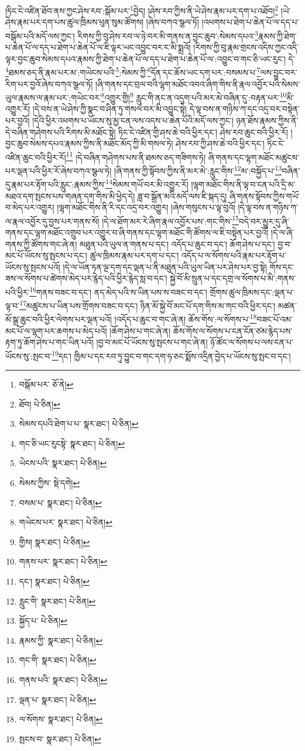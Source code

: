 །ཏིང་ངེ་འཛིན་ཐོབ་ནས་ཀྱང་ཤེས་རབ་:སྒོམ་པར་\footnote{བསྒོམ་པར་  ཅོ་ནེ། }བྱེད། །ཤེས་རབ་ཀྱིས་ནི་ཡེ་ཤེས་རྣམ་པར་དག་པ་འཐོབ།\footnote{ཐོབ།  པེ་ཅིན། } །ཡེ་ཤེས་རྣམ་པར་དག་པས་ཚུལ་ཁྲིམས་ཕུན་སུམ་ཚོགས། །ཞེས་བཀའ་སྩལ་ཏོ། །འཕགས་པ་ཐེག་པ་ཆེན་པོ་ལ་དད་པ་བསྒོམ་པའི་མདོ་ལས་ཀྱང་། རིགས་ཀྱི་བུ་ཤེས་རབ་ལ་ཉེ་བར་མི་གནས་ན་བྱང་ཆུབ་:སེམས་དཔའ་\footnote{སེམས་དཔའི་ཐེག་པ་པ་  སྣར་ཐང་།  པེ་ཅིན། }རྣམས་ཀྱི་ཐེག་པ་ཆེན་པོ་ལ་དད་པ་ཐེག་པ་ཆེན་པོ་ལ་ཇི་ལྟར་ཡང་འབྱུང་བར་ང་མི་སྨྲའོ། །རིགས་ཀྱི་བུ་རྣམ་གྲངས་འདིས་ཀྱང་འདི་ལྟར་བྱང་ཆུབ་སེམས་དཔའ་རྣམས་ཀྱི་ཐེག་པ་ཆེན་པོ་ལ་དད་པ་ཐེག་པ་ཆེན་པོ་ལ་:འབྱུང་བ་གང་ཅི་ཡང་རུང་། དེ་\footnote{གང་ཅི་ཡང་རུངསྟེ་  སྣར་ཐང་།  པེ་ཅིན། }ཐམས་ཅད་ནི་རྣམ་པར་མ་:གཡེངས་པའི་\footnote{ཡེངས་པའི་  སྣར་ཐང་།  པེ་ཅིན། }:སེམས་ཀྱི་\footnote{སེམས་ཀྱིས་  སྡེ་དགེ། }དོན་དང་ཆོས་ཡང་དག་པར་:བསམས་པ་\footnote{བསམ་པ་  སྣར་ཐང་།  པེ་ཅིན། }ལས་བྱུང་བར་རིག་པར་བྱའོ་ཞེས་བཀའ་སྩལ་ཏོ། །ཞི་གནས་དང་བྲལ་བའི་ལྷག་མཐོང་འབའ་ཞིག་གིས་ནི་རྣལ་འབྱོར་པའི་སེམས་ཡུལ་རྣམས་ལ་རྣམ་པར་:གཡེང་བར་\footnote{གཡེངས་པར་  སྣར་ཐང་།  པེ་ཅིན། }འགྱུར་གྱི།\footnote{གྱིས།  སྣར་ཐང་།  པེ་ཅིན། } རླུང་གི་ནང་ན་འདུག་པའི་མར་མེ་བཞིན་དུ་:བརྟན་པར་\footnote{གནས་པར་  སྣར་ཐང་།  པེ་ཅིན། }མི་འགྱུར་རོ། །དེ་བས་ན་ཡེ་ཤེས་ཀྱི་སྣང་བ་ཤིན་ཏུ་གསལ་བར་མི་འབྱུང་སྟེ། དེ་ལྟ་བས་ན་གཉིས་ཀ་དང་འདྲ་བར་བསྟེན་པར་བྱའོ། །དེའི་ཕྱིར་འཕགས་པ་ཡོངས་སུ་མྱ་ངན་ལས་འདས་པ་ཆེན་པོའི་མདོ་ལས་ཀྱང་། ཉན་ཐོས་རྣམས་ཀྱིས་ནི་དེ་བཞིན་གཤེགས་པའི་རིགས་མི་མཐོང་སྟེ། ཏིང་ངེ་འཛིན་གྱི་ཤས་ཆེ་བའི་ཕྱིར་དང་། ཤེས་རབ་ཆུང་བའི་ཕྱིར་རོ། །བྱང་ཆུབ་སེམས་དཔའ་རྣམས་ཀྱིས་ནི་མཐོང་མོད་ཀྱི་མི་གསལ་ཏེ། ཤེས་རབ་ཀྱི་ཤས་ཆེ་བའི་ཕྱིར་དང་། ཏིང་ངེ་འཛིན་ཆུང་བའི་ཕྱིར་རོ།\footnote{དང་།  སྣར་ཐང་།  པེ་ཅིན། } །དེ་བཞིན་གཤེགས་པས་ནི་ཐམས་ཅད་གཟིགས་ཏེ། ཞི་གནས་དང་ལྷག་མཐོང་མཚུངས་པར་ལྡན་པའི་ཕྱིར་རོ་ཞེས་བཀའ་སྩལ་ཏེ། །ཞི་གནས་ཀྱི་སྟོབས་ཀྱིས་ནི་མར་མེ་:རླུང་གིས་\footnote{རླུང་གི་  སྣར་ཐང་།  པེ་ཅིན། }མ་:བསྐྱོད་པ་\footnote{སྐྱོད་པ་  པེ་ཅིན། }བཞིན་དུ་རྣམ་པར་རྟོག་པའི་རླུང་:རྣམས་ཀྱིས་\footnote{རྣམས་ཀྱི་  སྣར་ཐང་།  པེ་ཅིན། }སེམས་གཡོ་བར་མི་འགྱུར་རོ། །ལྷག་མཐོང་གིས་ནི་ལྟ་བ་ངན་པའི་དྲི་མ་མཐའ་དག་སྤངས་པས་གཞན་དག་གིས་མི་ཕྱེད་དེ། ཟླ་བ་སྒྲོན་མའི་མདོ་ལས་ཇི་སྐད་དུ། ཞི་གནས་སྟོབས་ཀྱིས་གཡོ་བ་མེད་པར་འགྱུར། །ལྷག་མཐོང་གིས་ནི་རི་དང་འདྲ་བར་འགྱུར། །ཞེས་གསུངས་པ་ལྟ་བུའོ། །དེ་ལྟ་བས་ན་གཉིས་ཀ་ལ་རྣལ་འབྱོར་དུ་བྱས་པར་གནས་སོ། །དེ་ལ་ཐོག་མར་རེ་ཞིག་རྣལ་འབྱོར་པས་:གང་གིས་\footnote{གང་གི་  སྣར་ཐང་།  པེ་ཅིན། }བདེ་བར་མྱུར་དུ་ཞི་གནས་དང་ལྷག་མཐོང་འགྲུབ་པར་འགྱུར་བ་ཞི་གནས་དང་ལྷག་མཐོང་གི་ཚོགས་ལ་ཇི་བསྟེན་པར་བྱའོ། །དེ་ལ་ཞི་གནས་ཀྱི་ཚོགས་གང་ཞེ་ན། མཐུན་པའི་ཡུལ་ན་གནས་པ་དང་། འདོད་པ་ཆུང་བ་དང་། ཆོག་ཤེས་པ་དང་། བྱ་བ་མང་པོ་ཡོངས་སུ་སྤངས་པ་དང་། ཚུལ་ཁྲིམས་རྣམ་པར་དག་པ་དང་། འདོད་པ་ལ་སོགས་པའི་རྣམ་པར་རྟོག་པ་ཡོངས་སུ་སྤངས་པའོ། །དེ་ལ་ཡོན་ཏན་ལྔ་དག་དང་ལྡན་པ་ནི་མཐུན་པའི་ཡུལ་ཡིན་པར་ཤེས་པར་བྱ་སྟེ། གོས་དང་ཟས་ལ་སོགས་པ་ཚེགས་མེད་པར་རྙེད་པའི་ཕྱིར་རྙེད་སླ་བ་དང་། སྐྱེ་བོ་མི་སྲུན་པ་དང་དགྲ་ལ་སོགས་པ་མི་:གནས་པའི་ཕྱིར་\footnote{གནས་པའི་  སྣར་ཐང་།  པེ་ཅིན། }གནས་བཟང་བ་དང་། ནད་མེད་པའི་ས་ཡིན་པས་ས་བཟང་བ་དང་། གྲོགས་ཚུལ་ཁྲིམས་དང་:ལྡན་པ་ལྟ་བ་\footnote{ལྡན་པ་  སྣར་ཐང་།  པེ་ཅིན། }མཚུངས་པ་ཡིན་པས་གྲོགས་བཟང་བ་དང་། ཉིན་མོ་སྐྱེ་བོ་མང་པོ་དག་གིས་མ་གང་བའི་ཕྱིར་དང་། མཚན་མོ་སྒྲ་ཆུང་བའི་ཕྱིར་ལེགས་པར་ལྡན་པའོ། །འདོད་པ་ཆུང་བ་གང་ཞེ་ན། ཆོས་གོས་:ལ་སོགས་པ་\footnote{ལ་སོགས་  སྣར་ཐང་།  པེ་ཅིན། }བཟང་པོ་འམ་མང་པོ་ལ་ལྷག་པར་ཆགས་པ་མེད་པའོ། །ཆོག་ཤེས་པ་གང་ཞེ་ན། ཆོས་གོས་ལ་སོགས་པ་ངན་ངོན་ཙམ་རྙེད་པས་རྟག་ཏུ་ཆོག་ཤེས་པ་གང་ཡིན་པའོ། །བྱ་བ་མང་པོ་ཡོངས་སུ་སྤངས་པ་གང་ཞེ་ན། ཉོ་ཚོང་ལ་སོགས་པ་ལས་ངན་པ་ཡོངས་སུ་:སྤང་བ་\footnote{སྤངས་བ་  སྣར་ཐང་།  པེ་ཅིན། }དང་། ཁྱིམ་པ་དང་རབ་ཏུ་བྱུང་བ་གང་དག་ཧ་ཅང་སྨོས་འདྲིན་བྱེད་པ་ཡོངས་སུ་སྤང་བ་དང་། 